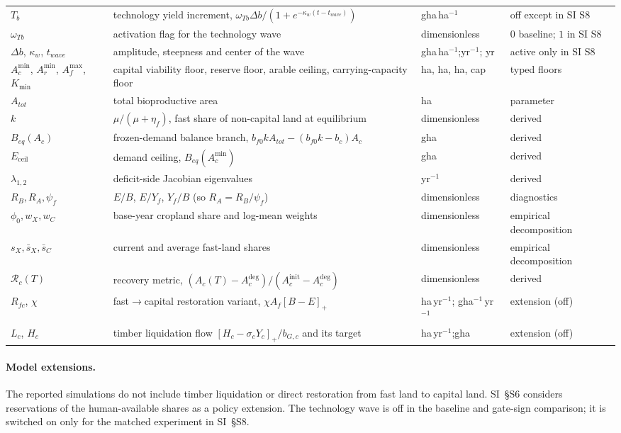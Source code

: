 \documentclass[11pt,a4paper]{article}
\newcommand{\pos}[1]{\left[#1\right]_+}
\newcommand{\Eceil}{E_{\mathrm{ceil}}}
\newcommand{\Acmin}{A_c^{\min}}
\begin{document}
\begin{longtable}{>{\raggedright\arraybackslash}p{}>{\raggedright\arraybackslash}p{}>{\raggedright\arraybackslash}p{}>{\raggedright\arraybackslash}p{}}
$T_b$ & technology yield increment, $\omega_{Tb}\Delta b/(1+e^{-\kappa_w(t-t_{wave})})$ & gha\,ha$^{-1}$ & off except in SI S8 \\
$\omega_{Tb}$ & activation flag for the technology wave & dimensionless & $0$ baseline; $1$ in SI S8 \\
$\Delta b$, $\kappa_w$, $t_{wave}$ & amplitude, steepness and center of the wave & gha\,ha$^{-1}$;\newline yr$^{-1}$; yr & active only in SI S8 \\
$\Acmin$, $A_r^{\min}$, $A_f^{\max}$, $K_{\min}$ & capital viability floor, reserve floor, arable ceiling, carrying-capacity floor & ha, ha, ha, cap & typed floors \\
$A_{tot}$ & total bioproductive area & ha & parameter \\
$k$ & $\mu/(\mu+\eta_f)$, fast share of non-capital land at equilibrium & dimensionless & derived \\
$B_{eq}(A_c)$ & frozen-demand balance branch, $b_{f0}kA_{tot}-(b_{f0}k-b_c)A_c$ & gha & derived \\
$\Eceil$ & demand ceiling, $B_{eq}(\Acmin)$ & gha & derived \\
$\lambda_{1,2}$ & deficit-side Jacobian eigenvalues & yr$^{-1}$ & derived \\
$R_B,R_A,\psi_f$ & $E/B$, $E/Y_f$, $Y_f/B$ (so $R_A=R_B/\psi_f$) & dimensionless & diagnostics \\
$\phi_0,w_X,w_C$ & base-year cropland share and log-mean weights & dimensionless & empirical decomposition \\
$s_X,\bar s_X,\bar s_C$ & current and average fast-land shares & dimensionless & empirical decomposition \\
$\mathcal R_c(T)$ & recovery metric, $(A_c(T)-A_c^{\mathrm{deg}})/(A_c^{\mathrm{init}}-A_c^{\mathrm{deg}})$ & dimensionless & derived \\
$R_{fc}$, $\chi$ & fast$\to$capital restoration variant, $\chi A_f\pos{B-E}$ & ha\,yr$^{-1}$; gha$^{-1}$\,yr$^{-1}$ & extension (off) \\
$L_c$, $H_c$ & timber liquidation flow $\pos{H_c-\sigma_cY_c}/b_{G,c}$ and its target & ha\,yr$^{-1}$;\newline gha & extension (off) \\
\bottomrule
\end{longtable}

\paragraph{Model extensions.} The reported simulations do not include timber liquidation or direct restoration from fast land to capital land. SI~\S S6 considers reservations of the human-available shares as a policy extension. The technology wave is off in the baseline and gate-sign comparison; it is switched on only for the matched experiment in SI~\S S8.
\end{document}
